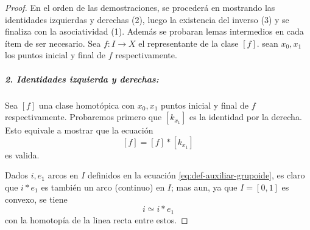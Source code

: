 \begin{proof}
En el orden de las demostraciones, se procederá en mostrando las
identidades izquierdas y derechas (2), luego la existencia del inverso
(3) y se finaliza con la asociatividad (1). Además se probaran lemas
intermedios en cada ítem de ser necesario. Sea \(f : I
\to X\) el representante de la clase \([f]\). sean \(x_0, x_1\) los
puntos inicial y final de \(f\) respectivamente.

\subparagraph{2. Identidades izquierda y derechas:} Sea \([f]\) una clase
homotópica con \(x_0, x_1\) puntos inicial y final de \(f\)
respectivamente. Probaremos primero que \([k_{x_1}]\) es la identidad
por la derecha. Esto equivale a mostrar que la ecuación
\[ [f] = [f] * [k_{x_1}]\]
es valida.

Dados \(i,e_1\) arcos en \(I\) definidos en la
ecuación \eqref{eq:def-auxiliar-grupoide},
es claro que \(i * e_1\) es también un arco (continuo) en \(I\); mas aun,
ya que \(I = [0,1]\) es convexo, se tiene
\begin{equation}
i \simeq i * e_1 \label{eq:ident-homotopy}
\end{equation}
con la homotopía de la linea recta entre estos.


\end{proof}
